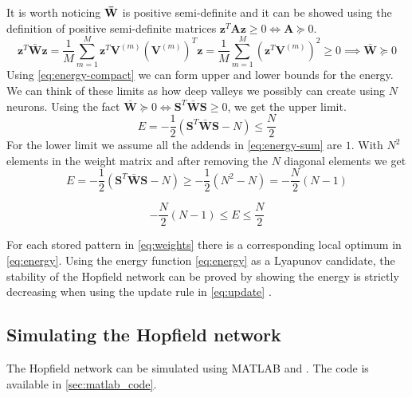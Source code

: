 It is worth noticing $\bf \bar{W}$ is positive semi-definite and it can be showed using the definition of positive semi-definite matrices $\mathbf{z}^T \mathbf{A} \mathbf{z} \geq 0 \iff \mathbf{A} \succeq 0$.
\begin{equation*}
\mathbf{z}^T\bar{\mathbf{W}} \mathbf{z} = \frac{1}{M}\sum_{m=1}^M \mathbf{z}^T \mathbf{V}^{(m)}(\mathbf{V}^{(m)})^T \mathbf{z} = \frac{1}{M}\sum_{m=1}^M (\mathbf{z}^T \mathbf{V}^{(m)})^2 \geq 0 \implies \mathbf{\bar{W}} \succeq 0
\end{equation*}
Using \cref{eq:energy-compact} we can form upper and lower bounds for the energy. We can think of these limits as how deep valleys we possibly can create using $N$ neurons. Using the fact $\mathbf{\bar{W}} \succeq 0 \iff \mathbf{S}^T \mathbf{\bar{W}}\mathbf{S} \geq 0$, we get the upper limit.
\begin{equation*}
    E = -\frac{1}{2}(\mathbf{S}^T \bar{\mathbf{W}} \mathbf{S} - N) \leq \frac{N}{2}
\end{equation*}
For the lower limit we assume all the addends in \cref{eq:energy-sum} are $1$. With $N^2$ elements in the weight matrix and after removing the $N$ diagonal elements we get
\begin{equation*}
    E = -\frac{1}{2}(\mathbf{S}^T \bar{\mathbf{W}} \mathbf{S} - N) \geq -\frac{1}{2} (N^2 - N) = -\frac{N}{2} (N-1) 
\end{equation*}

\begin{tcolorbox}[title={Energy Limits}]
    \begin{equation}\label{eq:energy-limits}
        -\frac{N}{2}(N-1) \leq E \leq \frac{N}{2}
    \end{equation}
\end{tcolorbox}

For each stored pattern in \cref{eq:weights} there is a corresponding local optimum in \cref{eq:energy}.
Using the energy function \cref{eq:energy} as a Lyapunov candidate, the stability of the Hopfield network can be proved by showing the energy is strictly decreasing when using the update rule in \cref{eq:update} \cite{lyapnuv-stability}.




\subsection{Simulating the Hopfield network}
The Hopfield network can be simulated using MATLAB and . The code is available in \cref{sec:matlab_code}.
